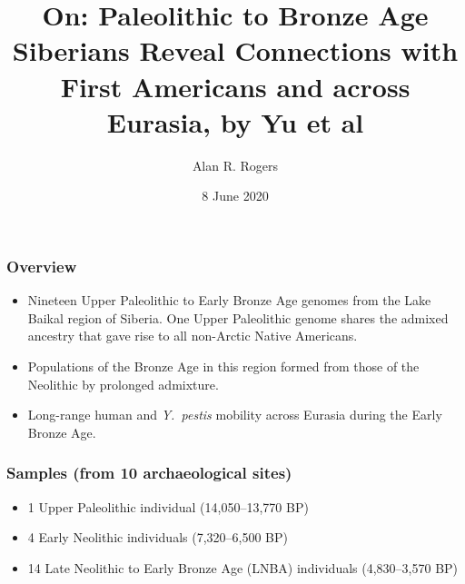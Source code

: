 \documentclass[pdftex,12pt,dvipsnames]{beamer}
\begin{document}
\title{On: Paleolithic to Bronze Age Siberians Reveal Connections with
  First Americans and across Eurasia, by Yu et al} 
\author{Alan R. Rogers}
\date{8 June 2020}
\frame{\titlepage}

\begin{frame}
  \frametitle{Overview}

  \begin{itemize}
\item Nineteen Upper Paleolithic to Early Bronze Age genomes from the
  Lake Baikal region of Siberia. One Upper Paleolithic genome shares
  the admixed ancestry that gave rise to all non-Arctic Native
  Americans.

\item Populations of the Bronze Age in this region formed from those
  of the Neolithic by prolonged admixture.

\item Long-range human and \emph{Y.\ pestis} mobility across Eurasia
  during the Early Bronze Age.
\end{itemize}  
\end{frame}

\begin{frame}
  \frametitle{Samples (from 10 archaeological sites)}
  \begin{itemize}
  \item 1 Upper Paleolithic individual (14,050--13,770 BP)
  \item 4 Early Neolithic individuals (7,320--6,500 BP)
  \item 14 Late Neolithic to Early Bronze Age (LNBA) individuals
    (4,830--3,570 BP)
  \end{itemize}
\end{frame}
\end{document}
